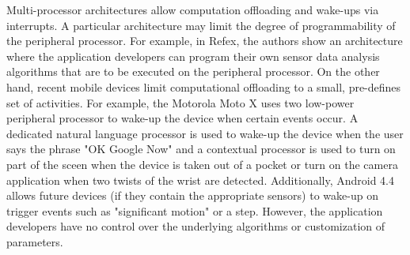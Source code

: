 Multi-processor architectures allow computation offloading and wake-ups via interrupts. A particular architecture may limit the degree of programmability of the peripheral processor. For example, in Refex\cite{reflex}, the authors show an architecture where the application developers can program their own sensor data analysis algorithms that are to be executed on the peripheral processor. On the other hand, recent mobile devices limit computational offloading to a small, pre-defines set of activities. For example, the Motorola Moto X uses two low-power peripheral processor to wake-up the device when certain events occur. A dedicated natural language processor is used to wake-up the device when the user says the phrase "OK Google Now" and a contextual processor is used to turn on part of the sceen when the device is taken out of a pocket or turn on the camera application when two twists of the wrist are detected. Additionally, Android 4.4 allows future devices (if they contain the appropriate sensors) to wake-up on trigger events such as "significant motion" or a step. However, the application developers have no control over the underlying algorithms or customization of parameters.
